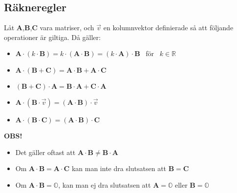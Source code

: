 \subsection{Räkneregler} %
\label{sub:r_kneregler}
Låt \textbf{A},\textbf{B},\textbf{C} vara matriser, och $\vec{v}$ en kolumnvektor definierade så att följande operationer är giltiga. Då gäller:
\begin{itemize}
	\item $\mathbf{A} \cdot (k \cdot \mathbf{B}) = k \cdot (\mathbf{A} \cdot \mathbf{B}) = (k \cdot \mathbf{A}) \cdot \mathbf{B}$ \mbox{ för } $k \in \mathbb{R}$
	\item $\mathbf{A} \cdot (\mathbf{B} + \mathbf{C}) = \mathbf{A} \cdot \mathbf{B} + \mathbf{A} \cdot \mathbf{C}$
	\item $(\mathbf{B} + \mathbf{C}) \cdot \mathbf{A} = \mathbf{B} \cdot \mathbf{A} + \mathbf{C} \cdot \mathbf{A}$
	\item $\mathbf{A} \cdot (\mathbf{B} \cdot \vec{v}) = (\mathbf{A} \cdot \mathbf{B}) \cdot \vec{v}$
	\item $\mathbf{A} \cdot (\mathbf{B} \cdot \mathbf{C}) = (\mathbf{A} \cdot \mathbf{B}) \cdot \mathbf{C}$
\end{itemize}
\begin{Rem}
\textbf{   O\textbf{B}S!}
    \begin{itemize}
    	\item Det gäller oftast att $\mathbf{A} \cdot \mathbf{B} \neq \mathbf{B} \cdot \mathbf{A}$
    	\item Om $\mathbf{A} \cdot \mathbf{B} = \mathbf{A} \cdot \mathbf{C}$ kan man inte dra slutsatsen att $\mathbf{B} = \mathbf{C}$
    	\item Om $\mathbf{A} \cdot \mathbf{B} = \mathbb{O}$, kan man ej dra slutsatsen att $\mathbf{A} = \mathbb{O}$ eller $\mathbf{B} = \mathbb{O}$
    \end{itemize}
\end{Rem}

